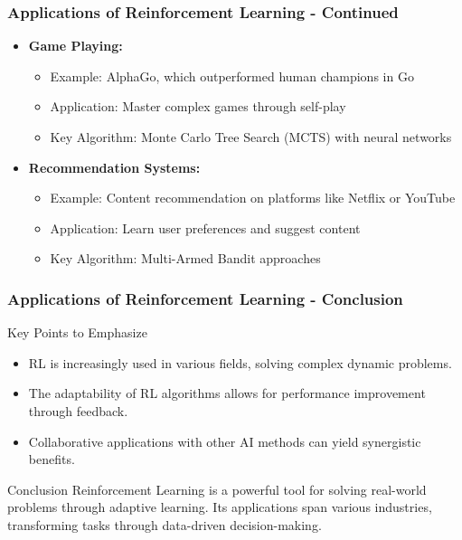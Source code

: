 \documentclass[aspectratio=169]{beamer}
\begin{document}
\begin{frame}[fragile]
    \frametitle{Applications of Reinforcement Learning - Continued}
    \begin{itemize}
        \item \textbf{Game Playing:}
        \begin{itemize}
            \item Example: AlphaGo, which outperformed human champions in Go
            \item Application: Master complex games through self-play
            \item Key Algorithm: Monte Carlo Tree Search (MCTS) with neural networks
        \end{itemize}

        \item \textbf{Recommendation Systems:}
        \begin{itemize}
            \item Example: Content recommendation on platforms like Netflix or YouTube
            \item Application: Learn user preferences and suggest content
            \item Key Algorithm: Multi-Armed Bandit approaches
        \end{itemize}
    \end{itemize}
\end{frame}

\begin{frame}[fragile]
    \frametitle{Applications of Reinforcement Learning - Conclusion}
    \begin{block}{Key Points to Emphasize}
        \begin{itemize}
            \item RL is increasingly used in various fields, solving complex dynamic problems.
            \item The adaptability of RL algorithms allows for performance improvement through feedback.
            \item Collaborative applications with other AI methods can yield synergistic benefits.
        \end{itemize}
    \end{block}
    \begin{block}{Conclusion}
        Reinforcement Learning is a powerful tool for solving real-world problems through adaptive learning. Its applications span various industries, transforming tasks through data-driven decision-making.
    \end{block}
\end{frame}
\end{document}
